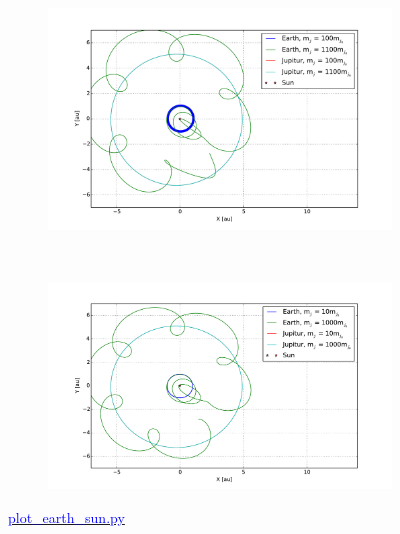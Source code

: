\begin{figure}[H]
    \centering
    \begin{subfigure}{0.5\textwidth}
        \centering
        \includegraphics[width=\linewidth]{result/bilder/jupitur-mass-three.pdf}
    	\caption{}
    \end{subfigure}%
    ~ 
    \begin{subfigure}{0.5\textwidth}
        \centering
        \includegraphics[width=\linewidth]{result/bilder/jupitur-mass-two.pdf}
        \caption{}
    \end{subfigure}
    \caption{\href{https://github.com/erikfsk/Project-3/blob/master/Project3/3a/plot_earth_sun.py}{\textcolor{blue}{plot\_earth\_sun.py}}}
    \label{fig:three-body-varying}
\end{figure}











